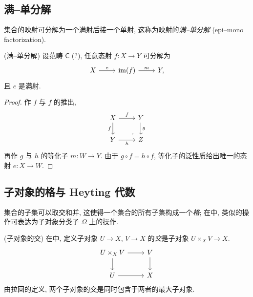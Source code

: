 
\subsection{满--单分解}

集合的映射可分解为一个满射后接一个单射, 这称为映射的\emph{满--单分解} (epi--mono factorization). %

\begin{prop}
    {(满--单分解)}
    设范畴 $\mathsf C$ (?), 任意态射 $f\colon X \to Y$ 可分解为 %
\[\begin{tikzcd}[ampersand replacement=\&]
	X \& {\operatorname{im}(f)} \& Y,
	\arrow["e", from=1-1, to=1-2]
	\arrow["m", from=1-2, to=1-3]
\end{tikzcd}\]
    且 $e$ 是满射.
\end{prop}

\begin{proof}
    作 $f$ 与 $f$ 的推出,
\[\begin{tikzcd}[ampersand replacement=\&]
	X \& Y \\
	Y \& Z
	\arrow["f"', from=1-1, to=2-1]
	\arrow["h"', from=2-1, to=2-2]
	\arrow["f", from=1-1, to=1-2]
	\arrow["g", from=1-2, to=2-2]
	\arrow["\lrcorner"{anchor=center, pos=0.125, rotate=180}, draw=none, from=2-2, to=1-1]
\end{tikzcd}\]
    再作 $g$ 与 $h$ 的等化子 $m \colon W \to Y$.
    由于 $g\circ f = h\circ f$, 等化子的泛性质给出唯一的态射 $e \colon X \to W$.
\end{proof}

\subsection{子对象的格与 Heyting 代数}

集合的子集可以取交和并, 这使得一个集合的所有子集构成一个\emph{格}; 在\topos{}中, 类似的操作可表达为子对象分类子 $\Omega$ 上的操作.

\begin{propdef}
	{(子对象的交)}
	在\topos{}中, 定义子对象 $U\to X$, $V\to X$ 的\emph{交}是子对象
	$U\times_X V \to X$.
	\[\begin{tikzcd}[ampersand replacement=\&]
		{U\times_X V} \& V \\
		U \& X
		\arrow[from=1-1, to=2-1]
		\arrow[from=2-1, to=2-2]
		\arrow[from=1-1, to=1-2]
		\arrow[from=1-2, to=2-2]
	\end{tikzcd}\]
	由拉回的定义, 两个子对象的交是同时包含于两者的最大子对象.
\end{propdef}

